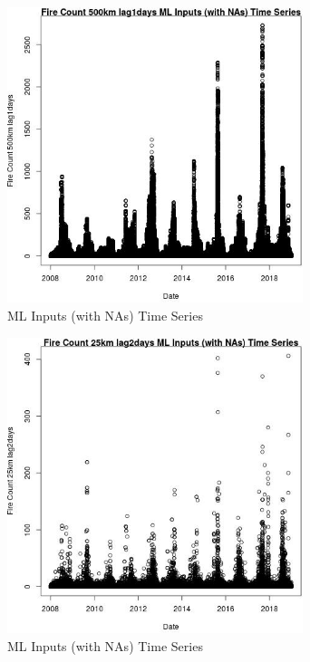 \begin{figure} 
\centering  
\includegraphics[width=0.77\textwidth]{Code_Outputs/Report_ML_input_PM25_Step4_part_f_de_duplicated_aveswNAs_Fire_Count_500km_lag1daysvDate.jpg} 
\caption{\label{fig:Report_ML_input_PM25_Step4_part_f_de_duplicated_aveswNAsFire_Count_500km_lag1daysvDate}ML Inputs (with NAs) Time Series} 
\end{figure} 
 

\begin{figure} 
\centering  
\includegraphics[width=0.77\textwidth]{Code_Outputs/Report_ML_input_PM25_Step4_part_f_de_duplicated_aveswNAs_Fire_Count_25km_lag2daysvDate.jpg} 
\caption{\label{fig:Report_ML_input_PM25_Step4_part_f_de_duplicated_aveswNAsFire_Count_25km_lag2daysvDate}ML Inputs (with NAs) Time Series} 
\end{figure} 
 

